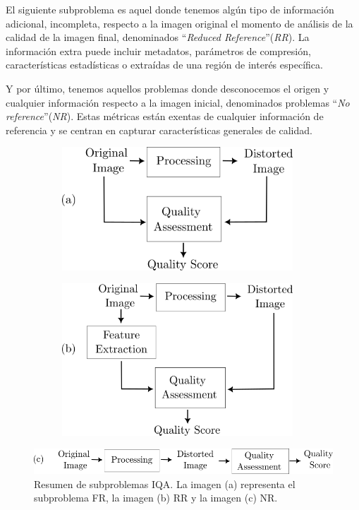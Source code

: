 El siguiente subproblema es aquel donde tenemos algún tipo de información adicional, incompleta, respecto 
a la imagen original el momento de análisis de la calidad de la imagen final,
denominados ``\emph{Reduced Reference}''(\emph{RR}). La información extra puede 
incluir metadatos, parámetros 
de compresión, características estadísticas o extraídas de una región de interés específica.
 
Y por último, tenemos aquellos problemas donde desconocemos el origen y cualquier 
información respecto a la imagen inicial, denominados problemas ``\emph{No reference}''(\emph{NR}).
Estas métricas están exentas de cualquier información de referencia y se 
centran en capturar características generales de calidad.

\begin{figure}[htp]
  \centering
  \begin{subfigure}{0.49\textwidth}
  \includegraphics[width=0.95\textwidth]{imagenes/chapter2/FullReferenceInk.png}
  \end{subfigure}
  \begin{subfigure}{0.49\textwidth}
  \includegraphics[width=0.95\textwidth]{imagenes/chapter2/ReducedReferenceInk.png}
  \end{subfigure}
  \par\bigskip
  \includegraphics[]{imagenes/chapter2/NoReferenceInk.png}
  \caption{Resumen de subproblemas IQA. La imagen (a) representa el subproblema FR, 
  la imagen (b) RR y la imagen (c) NR.}
  \label{fig:IQASubproblems}
\end{figure}


